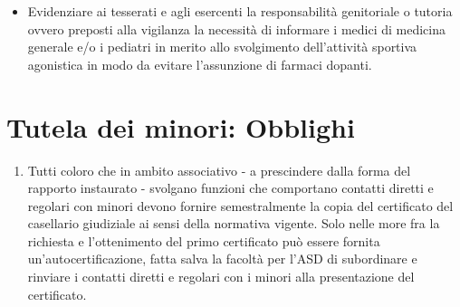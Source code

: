 \documentclass{djtsasddoc}
\begin{document}
\begin{enumerate}
\begin{enumerate}
\begin{itemize}
				\item Evidenziare ai tesserati e agli esercenti la responsabilità genitoriale o tutoria ovvero preposti alla vigilanza la necessità di informare i medici di medicina generale e/o i pediatri in merito allo svolgimento dell'attività sportiva agonistica in modo da evitare l'assunzione di farmaci dopanti.
			\end{itemize}
		\end{enumerate}
	\end{enumerate}
	
	\section{Tutela dei minori: Obblighi}
	\begin{enumerate}
		\item Tutti coloro che in ambito associativo - a prescindere dalla forma del rapporto instaurato - svolgano funzioni che comportano contatti diretti e regolari con minori devono fornire semestralmente la copia del certificato del casellario giudiziale ai sensi della normativa vigente. Solo nelle more fra la richiesta e l'ottenimento del primo certificato può essere fornita un'autocertificazione, fatta salva la facoltà per l'ASD di subordinare e rinviare i contatti diretti e regolari con i minori alla presentazione del certificato.
	\end{enumerate}
	
\end{document}
